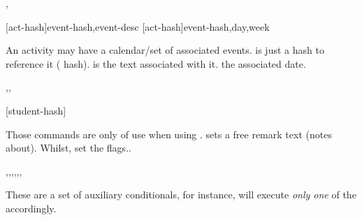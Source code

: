 \documentclass[article,nogeometry,english,tocdepth=3,secdepth=3]{ufrgscca} %
\begin{document}
\begin{codedescribe}[code,new=2023/11/18]{\ActivitySetNewEvent,\ActivitySetEventDay}
	\begin{codesyntax}%
    \tsmacro{\ActivitySetNewEvent}[act-hash]{event-hash,event-desc}
    \tsmacro{\ActivitySetEventDay}[act-hash]{event-hash,day,week}
	\end{codesyntax}
An activity may have a calendar/set of associated events.  is just a hash to reference it ( hash).  is the text associated with it.  the associated date.
\end{codedescribe}


\begin{codedescribe}[code,new=2023/11/18]{\studentremark,\studentnewpage,\distinctboard}
	\begin{codesyntax}%
		\tsmacro{\studentremark}{remarks}
		\tsmacro{\studentnewpage}[student-hash]{}
		\tsmacro{\distinctboard}{}
	\end{codesyntax}
Those commands are only of use when using . \tsmacro{\studentremark}{} sets a free remark text (notes about). Whilst, \tsobj{\distinctboard,\studentnewpage} set the  flags..
\end{codedescribe}


\begin{codedescribe}[code,new=2023/11/18,update=2023/12/02,update=2024/01/15]{\studentCase,\studentAdvCase,\studentCoadvCase,\studentDismissCase,\studentNewPageCase,\studentDistinctBoardCase,\studentReviewerCase}
	\begin{codesyntax}%
	\end{codesyntax}
These are a set of auxiliary conditionals, for instance, \tsobj{\StudentCase} will execute \emph{only one} of the  accordingly.
\end{codedescribe}
\end{document}
